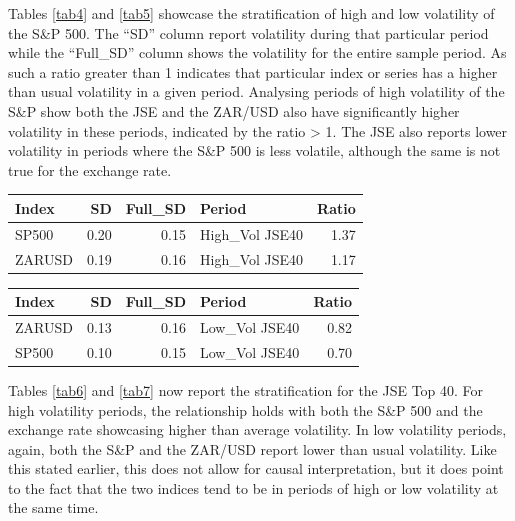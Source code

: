 \documentclass[11pt,preprint, authoryear]{elsarticle}
\let\origtable\table
\let\endorigtable\endtable
\renewenvironment{table}[1][2] {
    \expandafter\origtable\expandafter[H]
} {
    \endorigtable
}
\numberwithin{equation}{section}
\numberwithin{figure}{section}
\numberwithin{table}{section}
\begin{document}
Tables \ref{tab4} and \ref{tab5} showcase the stratification of high and
low volatility of the S\&P 500. The ``SD'' column report volatility
during that particular period while the ``Full\_SD'' column shows the
volatility for the entire sample period. As such a ratio greater than 1
indicates that particular index or series has a higher than usual
volatility in a given period. Analysing periods of high volatility of
the S\&P show both the JSE and the ZAR/USD also have significantly
higher volatility in these periods, indicated by the ratio
\textgreater{} 1. The JSE also reports lower volatility in periods where
the S\&P 500 is less volatile, although the same is not true for the
exchange rate.

\begin{table}[H]
\centering
\caption{JSE Top 40 High Volatility \label{tab6}} 
\begin{tabular}{lrrlr}
  \hline
Index & SD & Full\_SD & Period & Ratio \\ 
  \hline
SP500 & 0.20 & 0.15 & High\_Vol JSE40 & 1.37 \\ 
  ZARUSD & 0.19 & 0.16 & High\_Vol JSE40 & 1.17 \\ 
   \hline
\end{tabular}
\end{table}
\begin{table}[H]
\centering
\caption{JSE Top 40 Low Volatility \label{tab7}} 
\begin{tabular}{lrrlr}
  \hline
Index & SD & Full\_SD & Period & Ratio \\ 
  \hline
ZARUSD & 0.13 & 0.16 & Low\_Vol JSE40 & 0.82 \\ 
  SP500 & 0.10 & 0.15 & Low\_Vol JSE40 & 0.70 \\ 
   \hline
\end{tabular}
\end{table}

Tables \ref{tab6} and \ref{tab7} now report the stratification for the
JSE Top 40. For high volatility periods, the relationship holds with
both the S\&P 500 and the exchange rate showcasing higher than average
volatility. In low volatility periods, again, both the S\&P and the
ZAR/USD report lower than usual volatility. Like this stated earlier,
this does not allow for causal interpretation, but it does point to the
fact that the two indices tend to be in periods of high or low
volatility at the same time.
\end{document}

